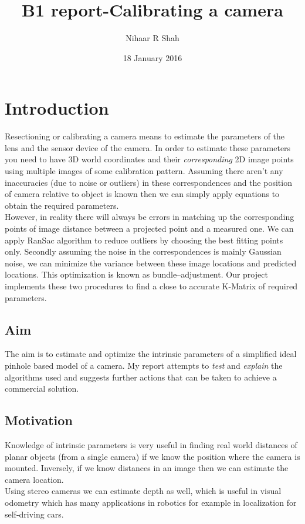 \documentclass[titlepage]{article}
\title{B1 report-Calibrating a camera}\\
\author{Nihaar R Shah}
\date{18 January 2016}
\begin{document}
\maketitle
\section{Introduction}
Resectioning or calibrating a camera means to estimate the parameters of the lens and the sensor device of the camera. In order to estimate these parameters you need to have 3D world coordinates and their \textit{corresponding} 2D image points using multiple images of some calibration pattern. Assuming there aren't any inaccuracies (due to noise or outliers) in these correspondences and the position of camera relative to object is known then we can simply apply equations to obtain the required parameters. \\
However, in reality there will always be errors in matching up the corresponding points of image distance between a projected point and a measured one. We can apply RanSac algorithm to reduce outliers by choosing the best fitting points only. Secondly assuming the noise in the correspondences is mainly Gaussian noise, we can minimize the variance between these image locations and predicted locations. This optimization is known as bundle–adjustment. Our project implements these two procedures to find a close to accurate K-Matrix of required parameters.
\subsection{Aim}
The aim is to estimate and optimize the intrinsic parameters of a simplified ideal pinhole based model of a camera. My report attempts to \textit{test} and \textit{explain} the algorithms used and suggests further actions that can be taken to achieve a commercial solution.
\subsection{Motivation}
Knowledge of intrinsic parameters is very useful in finding real world distances of planar objects (from a single camera) if we know the position where the camera is mounted. Inversely, if we know distances in an image then we can estimate the camera location.\\
Using stereo cameras we can estimate depth as well, which is useful in visual odometry which has many applications in robotics for example in localization for self-driving cars.
\end{document}
